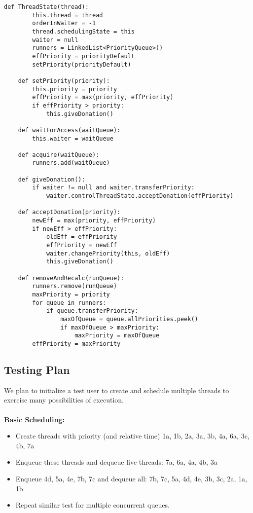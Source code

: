 \documentclass[11pt]{article}
\begin{document}
\begin{lstlisting}[frame=single]
    def ThreadState(thread):
        this.thread = thread
        orderInWaiter = -1
        thread.schedulingState = this
        waiter = null
        runners = LinkedList<PriorityQueue>()
        effPriority = priorityDefault
        setPriority(priorityDefault)
        
    def setPriority(priority):
        this.priority = priority
        effPriority = max(priority, effPriority)
        if effPriority > priority:
            this.giveDonation()
    
    def waitForAccess(waitQueue):
        this.waiter = waitQueue
    
    def acquire(waitQueue):
        runners.add(waitQueue)
    
    def giveDonation():
        if waiter != null and waiter.transferPriority:
            waiter.controlThreadState.acceptDonation(effPriority)
    
    def acceptDonation(priority):
        newEff = max(priority, effPriority)
        if newEff > effPriority:
            oldEff = effPriority
            effPriority = newEff
            waiter.changePriority(this, oldEff)
            this.giveDonation()
    
    def removeAndRecalc(runQueue):
        runners.remove(runQueue)
        maxPriority = priority
        for queue in runners:
            if queue.transferPriority:
                maxOfQueue = queue.allPriorities.peek()
                if maxOfQueue > maxPriority:
                    maxPriority = maxOfQueue
        effPriority = maxPriority
\end{lstlisting}
\normalsize

\subsection{Testing Plan}
We plan to initialize a test user to create and schedule multiple threads to exercise many possibilities of execution. \\\\
\textbf{Basic Scheduling:}
\begin{itemize}
\item Create threads with priority (and relative time) 1a, 1b, 2a, 3a, 3b, 4a, 6a, 3c, 4b, 7a
\item Enqueue these threads and dequeue five threads: 7a, 6a, 4a, 4b, 3a
\item Enqueue 4d, 5a, 4e, 7b, 7c and dequeue all: 7b, 7c, 5a, 4d, 4e, 3b, 3c, 2a, 1a, 1b
\item Repeat similar test for multiple concurrent queues.
\end{itemize}
\end{document}
